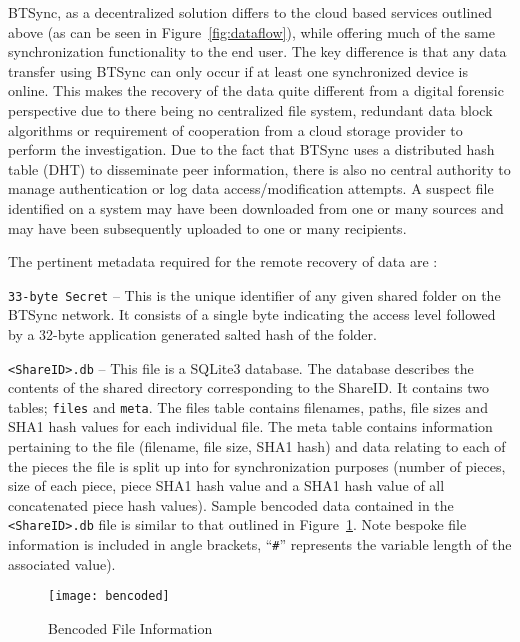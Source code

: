 \documentclass{jdfsl}
\begin{document}
BTSync, as a decentralized solution differs to the cloud based services outlined above (as can be seen in Figure~\ref{fig:dataflow}), while offering much of the same synchronization functionality to the end user. The key difference is that any data transfer using BTSync can only occur if at least one synchronized device is online. This makes the recovery of the data quite different from a digital forensic perspective due to there being no centralized file system, redundant data block algorithms or requirement of cooperation from a cloud storage provider to perform the investigation. Due to the fact that BTSync uses a distributed hash table (DHT) to disseminate peer information, there is also no central authority to manage authentication or log data access/modification attempts. A suspect file identified on a system may have been downloaded from one or many sources and may have been subsequently uploaded to one or many recipients. 

The pertinent metadata required for the remote recovery of data are \citep{Farina2014S77}:

\texttt{33-byte Secret} -- This is the unique identifier of any given shared folder on the BTSync network. It consists of a single byte indicating the access level followed by a 32-byte application generated salted hash of the folder.

\texttt{<ShareID>.db} -- This file is a SQLite3 database. The database describes the contents of the shared directory corresponding to the ShareID. It contains two tables; \texttt{files} and \texttt{meta}. The files table contains filenames, paths, file sizes and SHA1 hash values for each individual file. The meta table contains information pertaining to the file (filename, file size, SHA1 hash) and data relating to each of the pieces the file is split up into for synchronization purposes (number of pieces, size of each piece, piece SHA1 hash value and a SHA1 hash value of all concatenated piece hash values). Sample bencoded data contained in the \texttt{<ShareID>.db} file is similar to that outlined in Figure~\ref{fig:fileentry}. Note bespoke file information is included in angle brackets, ``\texttt{\#}'' represents the variable length of the associated value).

\begin{figure}[!h]
\centering
\texttt{[image: bencoded]}
\caption{Bencoded File Information}
\label{fig:fileentry}
\end{figure}
\end{document}
